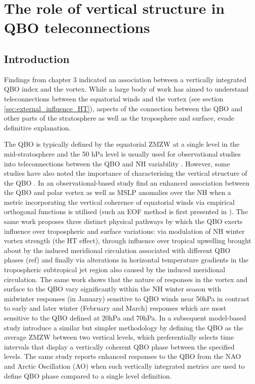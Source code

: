 \chapter{The role of vertical structure in QBO teleconnections}
\label{cha:deepQBO}

\section{Introduction}
\label{sec:deepQBO-introduction}

Findings from chapter 3 indicated an association between a vertically integrated QBO index and the vortex. While a large body of work has aimed to understand teleconnections between the equatorial winds and the vortex (see section \ref{sec:external_influence_HT}), aspects of the connection between the QBO and other parts of the stratosphere as well as the troposphere and surface, evade definitive explanation.

The QBO is typically defined by the equatorial ZMZW at a single level in the mid-stratosphere and the 50 hPa level is usually used for observational studies into teleconnections between the QBO and NH variability \citep{baldwinQuasiBiennial2001, Baldwin98}. However, some studies have also noted the importance of characterising the vertical structure of the QBO \citep{Fraedrih1993, Wallace1993,  Baldwin98,  Dunkerton2017, graySurface2018, andrewsObserved2019}. In an observational-based study \cite{graySurface2018} find an enhanced association between the QBO and polar vortex as well as MSLP anomalies over the NH when a metric incorporating the vertical coherence of equatorial winds via empirical orthogonal functions is utilised (such an EOF method is first presented in \citep{verena2016a}). The same work proposes three distinct physical pathways by which the QBO exerts influence over tropospheric and surface variations: via modulation of NH winter vortex strength (the HT effect), through influence over tropical upwelling brought about by the induced meridional circulation associated with different QBO phases (ref) and finally via alterations in horizontal temperature gradients in the tropospheric subtropical jet region also caused by the induced meridional circulation. The same work shows that the nature of responses in the vortex and surface to the QBO vary significantly within the NH winter season with midwinter responses (in January) sensitive to QBO winds near 50hPa in contrast to early and later winter (February and March) responses which are most sensitive to the QBO defined at 20hPa and 70hPa. In a subsequent model-based study \cite{andrewsObserved2019} introduce a similar but simpler methodology by defining the QBO as the average ZMZW between two vertical levels, which preferentially selects time intervals that display a vertically coherent QBO phase between the specified levels. The same study reports enhanced responses to the QBO from the NAO and Arctic Oscillation (AO) when such vertically integrated metrics are used to define QBO phase compared to a single level definition. 

